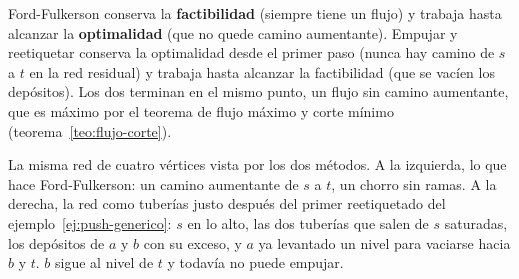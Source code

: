 \documentclass[11pt,letterpaper]{article}
\begin{document}
\begin{idea}
  Ford-Fulkerson conserva la \textbf{factibilidad} (siempre tiene un
  flujo) y trabaja hasta alcanzar la \textbf{optimalidad} (que no
  quede camino aumentante). Empujar y reetiquetar conserva la
  optimalidad desde el primer paso (nunca hay camino de $s$ a $t$ en
  la red residual) y trabaja hasta alcanzar la factibilidad (que se
  vacíen los depósitos). Los dos terminan en el mismo punto, un flujo
  sin camino aumentante, que es máximo por el teorema de flujo máximo
  y corte mínimo (teorema~\ref{teo:flujo-corte}).
\end{idea}

\begin{ejemplo}
  \label{ej:push-tuberias}
  La misma red de cuatro vértices vista por los dos métodos. A la
  izquierda, lo que hace Ford-Fulkerson: un camino aumentante de $s$ a
  $t$, un chorro sin ramas. A la derecha, la red como tuberías justo
  después del primer reetiquetado del ejemplo~\ref{ej:push-generico}:
  $s$ en lo alto, las dos tuberías que salen de $s$ saturadas, los
  depósitos de $a$ y $b$ con su exceso, y $a$ ya levantado un nivel
  para vaciarse hacia $b$ y $t$. $b$ sigue al nivel de $t$ y todavía no
  puede empujar.
  \begin{center}
\end{center}
\end{ejemplo}
\end{document}
